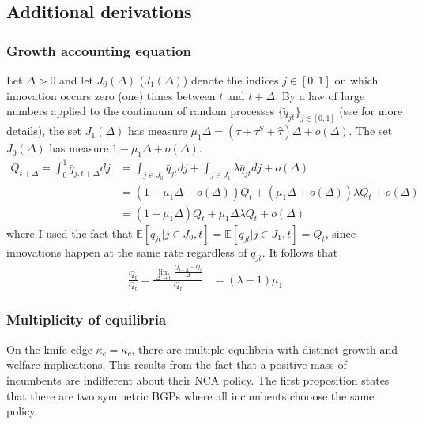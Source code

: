 \documentclass[11pt,english]{article}
\theoremstyle{definition}
\begin{document}
\subsection{Additional derivations}

\subsubsection{Growth accounting equation}\label{appendix:model:growth_accounting_equation}

Let $\Delta > 0$ and let $J_0(\Delta)$ ($J_1(\Delta)$) denote the indices $j\in [0,1]$ on which innovation occurs zero (one) times between $t$ and $t+\Delta$. By a law of large numbers applied to the continuum of random processes $\{\tilde{q}_{jt}\}_{j \in [0,1]}$ (see \cite{uhlig_law_1996} for more details), the set $J_1(\Delta)$ has measure $\mu_1 \Delta = (\tau + \tau^S + \hat{\tau})\Delta + o(\Delta)$. The set $J_0(\Delta)$ has measure $1 - \mu_1 \Delta + o(\Delta)$. 
\begin{align*}
	Q_{t+\Delta} = \int_0^1 \bar{q}_{j,t+\Delta} dj &= \int_{j \in J_0} \bar{q}_{jt} dj + \int_{j \in J_1} \lambda \bar{q}_{jt} dj + o(\Delta) \\
	&= (1 - \mu_1\Delta - o(\Delta)) Q_t + (\mu_1 \Delta + o(\Delta) ) \lambda Q_t + o(\Delta) \\
	&= (1 - \mu_1\Delta) Q_t + \mu_1\Delta \lambda Q_t + o(\Delta)
\end{align*}
where I used the fact that $\mathbb{E}[\bar{q}_{jt} | j \in J_0, t]  = \mathbb{E}[\bar{q}_{jt} | j \in J_1, t] = Q_t$, since innovations happen at the same rate regardless of $\bar{q}_{jt}$. It follows that
\begin{align*}
	\frac{\dot{Q}_t}{Q_t} = \frac{\lim_{\Delta \to 0} \frac{Q_{t+\Delta} - Q_t}{\Delta}}{Q_t} &= (\lambda - 1)\mu_1 
\end{align*}

\subsubsection{Multiplicity of equilibria}\label{appendix:model:multiplicity_of_equilibria}

On the knife edge $\kappa_c = \bar{\kappa}_c$, there are multiple equilibria with distinct growth and welfare implications. This results from the fact that a positive mass of incumbents are indifferent about their NCA policy. The first proposition states that there are two symmetric BGPs where all incumbents chooose the same policy.
\end{document}
